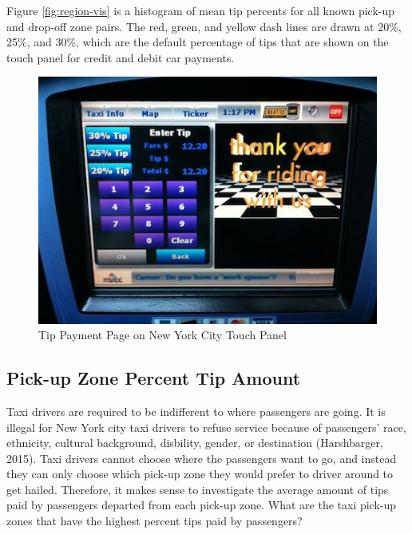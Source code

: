 \documentclass[12pt,twoside]{reedthesis}
\theoremstyle{definition}
\theoremstyle{definition}
\theoremstyle{definition}
\theoremstyle{remark}
\begin{document}
Figure \ref{fig:region-vis} is a histogram of mean tip percents for all
known pick-up and drop-off zone pairs. The red, green, and yellow dash
lines are drawn at 20\%, 25\%, and 30\%, which are the default
percentage of tips that are shown on the touch panel for credit and
debit car payments.
\begin{figure}

{\centering \includegraphics[width=4.8in]{figure/taxi-screen} 

}

\caption{Tip Payment Page on New York City Touch Panel}\label{fig:taxi-screen}
\end{figure}
\subsection{Pick-up Zone Percent Tip
Amount}\label{pick-up-zone-percent-tip-amount}

Taxi drivers are required to be indifferent to where passengers are
going. It is illegal for New York city taxi drivers to refuse service
because of passengers' race, ethnicity, cultural background, disbility,
gender, or destination (Harshbarger, 2015). Taxi drivers cannot choose
where the passengers want to go, and instead they can only choose which
pick-up zone they would prefer to driver around to get hailed.
Therefore, it makes sense to investigate the average amount of tips paid
by passengers departed from each pick-up zone. What are the taxi pick-up
zones that have the highest percent tips paid by passengers?
\end{document}
